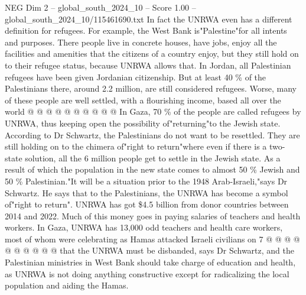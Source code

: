 \begin{textsample}{NEG Dim 2 – global\_south\_2024\_10 – Score 1.00 – global\_south\_2024\_10/115461690.txt}
In fact the UNRWA even has a different definition for refugees.
For example, the West Bank is"Palestine"for all intents and purposes.
There people live in concrete houses, have jobs, enjoy all the facilities and amenities that the citizens of a country enjoy, but they still hold on to their refugee status, because UNRWA allows that.
In Jordan, all Palestinian refugees have been given Jordanian citizenship.
But at least 40 \% of the Palestinians there, around 2.2 million, are still considered refugees.
Worse, many of these people are well settled, with a flourishing income, based all over the world @ @ @ @ @ @ @ @ @ @ In Gaza, 70 \% of the people are called refugees by UNRWA, thus keeping open the possibility of"returning"to the Jewish state.
According to Dr Schwartz, the Palestinians do not want to be resettled.
They are still holding on to the chimera of"right to return"where even if there is a two-state solution, all the 6 million people get to settle in the Jewish state.
As a result of which the population in the new state comes to almost 50 \% Jewish and 50 \% Palestinian."It will be a situation prior to the 1948 Arab-Israeli,"says Dr Schwartz.
He says that to the Palestinians, the UNRWA has become a symbol of"right to return".
UNRWA has got \$4.5 billion from donor countries between 2014 and 2022.
Much of this money goes in paying salaries of teachers and health workers.
In Gaza, UNRWA has 13,000 odd teachers and health care workers, most of whom were celebrating as Hamas attacked Israeli civilians on 7 @ @ @ @ @ @ @ @ @ @ that the UNRWA must be disbanded, says Dr Schwartz, and the Palestinian ministries in West Bank should take charge of education and health, as UNRWA is not doing anything constructive except for radicalizing the local population and aiding the Hamas.

\end{textsample}
